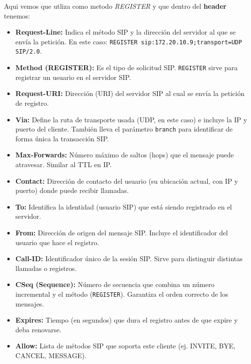 \documentclass[10pt]{article}
\begin{document}
Aqui vemos que utliza como metodo \textit{REGISTER} y que dentro del \textbf{header} tenemos: 
\begin{itemize}
    \item \textbf{Request-Line:} Indica el método SIP y la dirección del servidor al que se envía la petición. 
    En este caso: \texttt{REGISTER sip:172.20.10.9;transport=UDP SIP/2.0}.
    
    \item \textbf{Method (REGISTER):} Es el tipo de solicitud SIP. \texttt{REGISTER} sirve para registrar un usuario en el servidor SIP.

    \item \textbf{Request-URI:} Dirección (URI) del servidor SIP al cual se envía la petición de registro.

    \item \textbf{Via:} Define la ruta de transporte usada (UDP, en este caso) e incluye la IP y puerto del cliente. 
    También lleva el parámetro \texttt{branch} para identificar de forma única la transacción SIP.

    \item \textbf{Max-Forwards:} Número máximo de saltos (hops) que el mensaje puede atravesar. Similar al TTL en IP.

    \item \textbf{Contact:} Dirección de contacto del usuario (su ubicación actual, con IP y puerto) donde puede recibir llamadas.

    \item \textbf{To:} Identifica la identidad (usuario SIP) que está siendo registrado en el servidor.

    \item \textbf{From:} Dirección de origen del mensaje SIP. Incluye el identificador del usuario que hace el registro.

    \item \textbf{Call-ID:} Identificador único de la sesión SIP. Sirve para distinguir distintas llamadas o registros.

    \item \textbf{CSeq (Sequence):} Número de secuencia que combina un número incremental y el método (\texttt{REGISTER}).
    Garantiza el orden correcto de los mensajes.

    \item \textbf{Expires:} Tiempo (en segundos) que dura el registro antes de que expire y deba renovarse.

    \item \textbf{Allow:} Lista de métodos SIP que soporta este cliente (ej. INVITE, BYE, CANCEL, MESSAGE).


\end{itemize}
\end{document}
